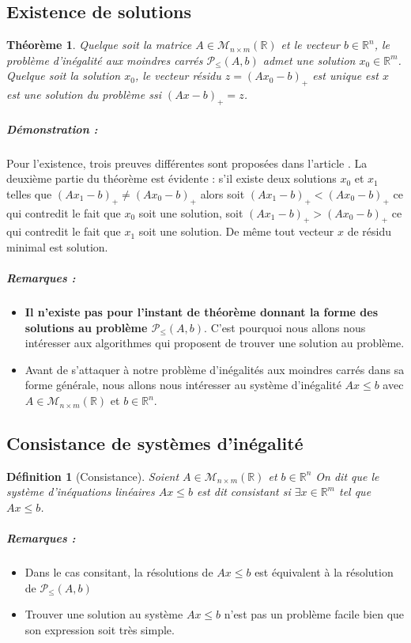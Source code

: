 \documentclass[10pt,a4paper]{article}
\newtheorem{thm}{Théorème}
\newtheorem{mydef}{Définition}
\begin{document}
\subsection{Existence de solutions}

\begin{thm}
  Quelque soit la matrice $A \in \mathcal{M}_{n \times m}(\mathbb{R})$ et le vecteur $b \in \mathbb{R}^n$, le problème d'inégalité aux moindres carrés $\mathcal{P}_{\leq}(A, b)$ admet une solution $x_0 \in \mathbb{R}^m$.
  Quelque soit la solution $x_0$, le vecteur résidu $z = (Ax_0 - b)_+$ est unique est $x$ est une solution du problème ssi $(Ax - b)_+ = z$.
\end{thm}
\subparagraph{Démonstration :}
Pour l'existence, trois preuves différentes sont proposées dans l'article \cite{LSCHUP}.
La deuxième partie du théorème est évidente : s'il existe deux solutions $x_0$ et $x_1$ telles que $(Ax_1 - b)_+ \neq (Ax_0 - b)_+$ alors soit $(Ax_1 - b)_+ < (Ax_0 - b)_+$ ce qui contredit le fait que $x_0$ soit une solution, soit $(Ax_1 - b)_+ > (Ax_0 - b)_+$ ce qui contredit le fait que $x_1$ soit une solution.
De même tout vecteur $x$ de résidu minimal est solution.


\subparagraph{Remarques :}
\begin{itemize}
\item \textbf{Il n'existe pas pour l'instant de théorème donnant la forme des solutions au problème $\mathcal{P}_{\leq}(A, b)$}.
C'est pourquoi nous allons nous intéresser aux algorithmes qui proposent de trouver une solution au problème.
\item Avant de s'attaquer à notre problème d'inégalités aux moindres carrés dans sa forme générale, nous allons nous intéresser au système d'inégalité $Ax \leq b$ avec $A \in \mathcal{M}_{n \times m}(\mathbb{R})$ et $b \in \mathbb{R}^n$.
\end{itemize}

\subsection{Consistance de systèmes d'inégalité}
\begin{mydef}[Consistance]
Soient $A \in \mathcal{M}_{n \times m}(\mathbb{R})$ et $b \in \mathbb{R}^n$
On dit que le système d'inéquations linéaires $Ax \leq b$ est dit consistant si $\exists x \in \mathbb{R}^m$ tel que $Ax \le b$.
\end{mydef}
\subparagraph{Remarques :}
\begin{itemize}
  \item Dans le cas consitant, la résolutions de $Ax \leq b$ est équivalent à la résolution de $\mathcal{P}_{\leq}(A, b)$
  \item Trouver une solution au système $Ax \leq b$ n'est pas un problème facile bien que son expression soit très simple.
\end{itemize}
\end{document}

